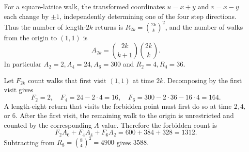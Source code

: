 For a square-lattice walk, the transformed coordinates $u=x+y$ and $v=x-y$ each change by $\pm1$, independently determining one of the four step directions. Thus the number of length-$2k$ returns is $R_{2k}=\binom{2k}{k}^2$, and the number of walks from the origin to $(1,1)$ is
\[
A_{2k}=\binom{2k}{k+1}\binom{2k}{k}.
\]
In particular $A_2=2,A_4=24,A_6=300$ and $R_2=4,R_4=36$.

Let $F_{2k}$ count walks that first visit $(1,1)$ at time $2k$. Decomposing by the first visit gives
\[
F_2=2,\quad F_4=24-2\cdot4=16,\quad
F_6=300-2\cdot36-16\cdot4=164.
\]
A length-eight return that visits the forbidden point must first do so at time $2,4$, or $6$. After the first visit, the remaining walk to the origin is unrestricted and counted by the corresponding $A$ value. Therefore the forbidden count is
\[
F_2A_6+F_4A_4+F_6A_2=600+384+328=1312.
\]
Subtracting from $R_8=\binom84^2=4900$ gives $\boxed{3588}$.
